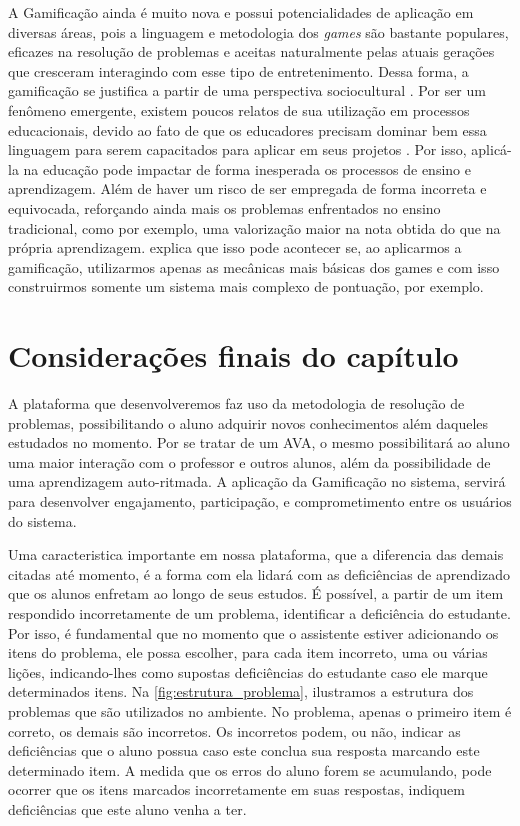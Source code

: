 A Gamificação ainda \'e muito nova e possui potencialidades de aplica\c{c}\~ao em diversas áreas, pois a linguagem e metodologia dos 
\textit{games} s\~ao bastante populares, eficazes na resolução de problemas e aceitas naturalmente pelas atuais gera\c{c}\~oes que 
cresceram interagindo com esse tipo de entretenimento. Dessa forma, a gamificação se justifica a partir de uma perspectiva sociocultural 
\cite{fardo2013gamificaccao}. Por ser um fen\^omeno emergente, existem poucos relatos de sua utiliza\c{c}\~ao em processos educacionais, 
devido ao fato de que os educadores precisam dominar bem essa linguagem para serem capacitados para aplicar em seus projetos 
\cite{fardo2013gamificaccao}. Por isso, aplic\'a-la na educa\c{c}\~ao pode impactar de forma inesperada os processos de ensino e 
aprendizagem. Al\'em de haver um risco de ser empregada de forma incorreta e equivocada, refor\c{c}ando ainda mais os problemas enfrentados 
no ensino tradicional, como por exemplo, uma valoriza\c{c}\~ao maior na nota obtida do que na pr\'opria 
aprendizagem.  explica que isso pode acontecer se, ao aplicarmos a gamifica\c{c}\~ao, utilizarmos
apenas as mecânicas mais básicas dos games e com isso construirmos somente um sistema mais complexo de pontuação, por exemplo.   



\section{Considerações finais do cap\'itulo}

A plataforma que desenvolveremos faz uso da metodologia de resolução de problemas, possibilitando o aluno adquirir novos conhecimentos além daqueles estudados no momento. Por se tratar de um AVA, 
o mesmo possibilitará ao aluno uma maior interação com o professor e outros alunos, além da possibilidade de uma aprendizagem auto-ritmada. A aplicação da Gamificação no sistema, servir\'a para desenvolver  engajamento, participação, e comprometimento entre os usuários do sistema. 

Uma caracteristica importante em nossa plataforma, que a diferencia das demais citadas até momento, é a forma com ela lidará com as deficiências de aprendizado que os alunos enfretam ao longo de seus estudos. É possível, a partir de um item respondido incorretamente de um problema, identificar a deficiência do estudante. Por isso, é fundamental que no momento que o assistente estiver adicionando os itens do problema, ele possa escolher, para cada item incorreto, uma ou várias li\c{c}\~oes, indicando-lhes como supostas defici\^encias do estudante caso ele marque determinados itens. Na \autoref{fig:estrutura_problema}, ilustramos a estrutura dos problemas que são utilizados no ambiente. No problema, apenas o primeiro item é correto, os demais são incorretos. Os incorretos podem, ou não, indicar as deficiências que o aluno possua caso este conclua sua resposta marcando este determinado item. A medida que os erros do aluno forem se acumulando, pode ocorrer que os itens marcados incorretamente em suas respostas, indiquem deficiências que este aluno venha a ter.


